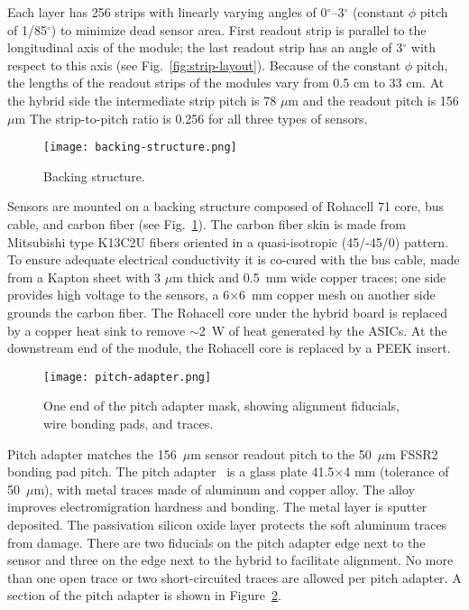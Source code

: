 Each layer has 256 strips with linearly varying angles of 0$^\circ$--3$^\circ$ (constant $\phi$ pitch of 1/85$^\circ$) to minimize dead sensor area. First readout strip is parallel to the longitudinal axis of the module; the last readout strip has an angle of 3$^\circ$ with respect to this axis (see Fig.~\ref{fig:strip-layout}). Because of the constant $\phi$ pitch, the lengths of the readout strips of the modules vary from 0.5 cm to 33 cm. At the hybrid side the intermediate strip pitch is 78 $\mu$m and the readout pitch is 156 $\mu$m The strip-to-pitch ratio is 0.256 for all three types of sensors.

\begin{figure}[hbt] 
\centering 
\texttt{[image: backing-structure.png]}
\caption{Backing structure.}
\label{fig:backing-structure}
\end{figure}

Sensors are mounted on a backing structure composed of Rohacell 71 core, bus cable, and carbon fiber (see Fig.~\ref{fig:backing-structure}). The carbon fiber skin is made from Mitsubishi type K13C2U fibers oriented in a quasi-isotropic (45/-45/0) pattern. To ensure adequate electrical conductivity it is co-cured with the bus cable, made from a Kapton sheet with 3 $\mu$m thick and 0.5~mm wide copper traces; one side provides high voltage to the sensors, a 6$\times$6~mm copper mesh on another side grounds the carbon fiber.  The Rohacell core under the hybrid board is replaced by a copper heat sink to remove $\sim$2~W of heat generated by the ASICs. At the downstream end of the module, the Rohacell core is replaced by a PEEK insert.  

\begin{figure}[hbt] 
\centering 
\texttt{[image: pitch-adapter.png]}
\caption{One end of the pitch adapter mask, showing alignment fiducials, wire bonding pads, and traces.}
\label{fig:pitch-adapter}
\end{figure}

Pitch adapter matches the 156~$\mu$m sensor readout pitch to the 50~$\mu$m FSSR2 bonding pad pitch. The pitch adapter~\cite{PA} is a glass plate 41.5$\times$4 mm (tolerance of 50~$\mu$m), with metal traces made of aluminum and copper alloy. The alloy improves electromigration hardness and bonding. The metal layer is sputter deposited. The passivation silicon oxide layer protects the soft aluminum traces from damage. There are two fiducials on the pitch adapter edge next to the sensor and three on the edge next to the hybrid to facilitate alignment. No more than one open trace or two short-circuited traces are allowed per pitch adapter. A section of the pitch adapter is shown in Figure~\ref{fig:pitch-adapter}. 

